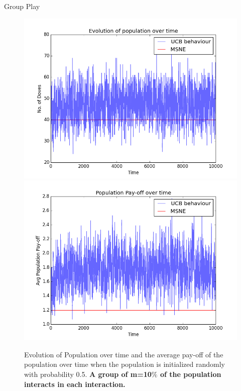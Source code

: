 \documentclass{IFES-beamer}
\begin{document}
        \begin{frame}{Group Play}
            \begin{figure}
                \centering
                \includegraphics[scale=0.25]{Images/UCB/Population/group_100_10000_epochs.png}
                \includegraphics[scale=0.25]{Images/UCB/Pay-off/pay-off_group_100_10000_epochs.png}
                \caption{Evolution of Population over time and the average pay-off of the population over time when the population is initialized randomly with probability 0.5. \textbf{A group of m=10$\%$ of the population interacts in each interaction.}}
                \label{fig:my_label}
            \end{figure}
        \end{frame}
        
\end{document}
